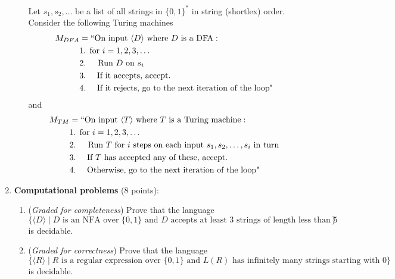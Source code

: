 \documentclass[12pt, oneside]{article}
\newcommand{\gradeCorrect}{({\it Graded for correctness}) }
\newcommand{\gradeComplete}{({\it Graded for completeness}) }
\begin{document}
\begin{enumerate}[wide, labelwidth=!, labelindent=0pt]
\begin{enumerate}
    Let $s_1, s_2, \ldots$ be a list of all strings in 
    $\{0,1\}^*$ in string (shortlex) order. Consider the following Turing machines
    \begin{align*}
        M_{DFA} &= ``\text{On input $\langle D \rangle$ where $D$ is a DFA}:\\
         &\text{1. for $i=1, 2, 3, \ldots$} \\
         &\text{2.~~~ Run $D$ on $s_i$} \\
         &\text{3.~~~~If it accepts, accept.}\\
         &\text{4.~~~~If it rejects, go to the next iteration of the loop"}\\
     \end{align*}
     and
     \begin{align*}
        M_{TM} &= ``\text{On input $\langle T \rangle$ where $T$ is a Turing machine}:\\
         &\text{1. for $i=1, 2, 3, \ldots$} \\
         &\text{2.~~~ Run $T$ for $i$ steps on each input $s_1, s_2, \ldots, s_i$ in turn} \\
         &\text{3.~~~~If $T$ has accepted any of these, accept.}\\
         &\text{4.~~~~Otherwise, go to the next iteration of the loop"}\\
     \end{align*}
\end{enumerate}


\item\textbf{Computational problems} (8 points):

\begin{enumerate}
    \item\gradeComplete Prove that the language $$\{\langle D \rangle \mid D \text{ is an NFA over $\{0,1\}$ and $D$ accepts at least $3$ strings 
    of length less than $5$ }\}$$
    is decidable.
    \item\gradeCorrect Prove that the language $$\{\langle R \rangle \mid R \text{ is a regular expression over $\{0,1\}$ and } L(R) \text{ has
    infinitely many strings starting with $0$} \}$$ is decidable.
\end{enumerate}

\end{enumerate}
\newpage
\end{document}
